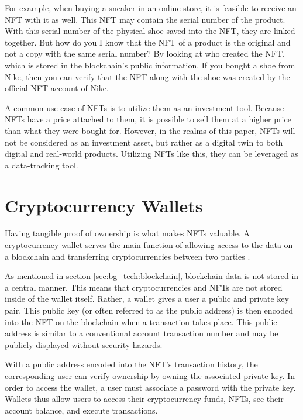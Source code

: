 
For example, when buying a sneaker in an online store, it is feasible to receive an NFT with it as well. This NFT may contain the serial number of the product. With this serial number of the physical shoe saved into the NFT, they are linked together. But how do you I know that the NFT of a product is the original and not a copy with the same serial number? By looking at who created the NFT, which is stored in the blockchain's public information. If you bought a shoe from Nike, then you can verify that the NFT along with the shoe was created by the official NFT account of Nike.

A common use-case of NFTs is to utilize them as an investment tool. Because NFTs have a price attached to them, it is possible to sell them at a higher price than what they were bought for. However, in the realms of this paper, NFTs will not be considered as an investment asset, but rather as a digital twin to both digital and real-world products. Utilizing NFTs like this, they can be leveraged as a data-tracking tool.

%
%
\section{Cryptocurrency Wallets}
\label{sec:bg_tech:wallets}

Having tangible proof of ownership is what makes NFTs valuable. A cryptocurrency wallet serves the main function of allowing access to the data on a blockchain and transferring cryptocurrencies between two parties \cite{wallets1}.

As mentioned in section \ref{sec:bg_tech:blockchain}, blockchain data is not stored in a central manner. This means that cryptocurrencies and NFTs are not stored inside of the wallet itself. Rather, a wallet gives a user a public and private key pair. This public key (or often referred to as the public address) is then encoded into the NFT on the blockchain when a transaction takes place. This public address is similar to a conventional account transaction number and may be publicly displayed without security hazards.

With a public address encoded into the NFT's transaction history, the corresponding user can verify ownership by owning the associated private key. In order to access the wallet, a user must associate a password with the private key. Wallets thus allow users to access their cryptocurrency funds, NFTs, see their account balance, and execute transactions. \cite{wallets2}

